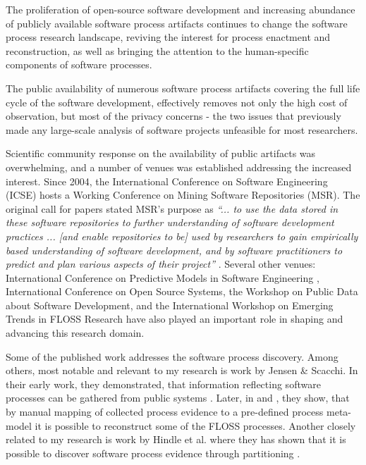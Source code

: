 The proliferation of open-source software development and increasing abundance of publicly available 
software process artifacts continues to change the software process research landscape,
reviving the interest for process enactment and reconstruction, as well as bringing the attention to the 
human-specific components of software processes. 

The public availability of numerous software process artifacts covering the full life cycle of the software
development, effectively removes not only the high cost of observation, but most of the privacy concerns - 
the two issues that previously made any large-scale analysis of software projects unfeasible for most researchers.

Scientific community response on the availability of public artifacts was overwhelming, and a number of 
venues was established addressing the increased interest. 
Since 2004, the International Conference on Software Engineering (ICSE) hosts a Working Conference on 
Mining Software Repositories (MSR). The original call for papers stated MSR's purpose as 
\textit{``... to use the data stored in these software repositories to further understanding of software 
development practices ... [and enable repositories to be] used by researchers to gain empirically based 
understanding of software development, and by software practitioners to predict and plan various aspects 
of their project''} \cite{msr2004} \cite{citeulike:7853299}. 
Several other venues: International Conference on Predictive Models in Software Engineering \cite{promise12}, 
International Conference on Open Source Systems, the Workshop on Public Data about Software Development, 
and the International Workshop on Emerging Trends in FLOSS Research have also played
an important role in shaping and advancing this research domain.

Some of the published work addresses the software process discovery. Among others, most notable and 
relevant to my research is work by Jensen \& Scacchi. In their early work, they demonstrated, that 
information reflecting software processes can be gathered from public systems \cite{citeulike:12550640}. 
Later, in \cite{citeulike:5043664} and \cite{citeulike:5128808}, they show, that by manual mapping of 
collected process evidence to a pre-defined process meta-model it is possible to reconstruct some 
of the FLOSS processes. 
Another closely related to my research is work by Hindle et al. where they has shown that it is possible to 
discover software process evidence through partitioning \cite{citeulike:10377366}.

